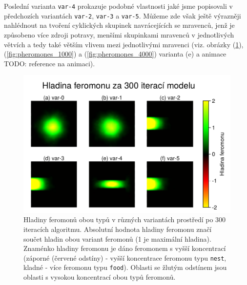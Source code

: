 \documentclass[10pt,a4paper,twocolumn]{article}
\begin{document}
Poslední varianta \texttt{var-4} prokazuje podobné vlastnosti 
jaké jsme popisovali v předchozích variantách 
\texttt{var-2}, \texttt{var-3} a \texttt{var-5}. Můžeme zde však ještě 
výrazněji nahlédnout na tvoření cyklických skupinek navrácejících
se mravenců, jenž je způsobeno více zdroji potravy, menšími skupinkami
mravenců v jednotlivých větvích a tedy také větším vlivem mezi 
jednotlivými mravenci (viz. obrázky (\ref{fig:pheromones_300}), 
(\ref{fig:pheromones_1000}) a (\ref{fig:pheromones_4000}) varianta (e)
a animace TODO: reference na animaci).


\begin{figure}[tb]
  \centering
  \includegraphics[width=0.98\linewidth]{images/pheromone_levels_300.pdf}
  \caption{Hladiny feromonů obou typů v různých variantách prostředí 
  po 300 iteracích algoritmu. 
  Absolutní hodnota hladiny feromonu značí součet hladin obou variant
  feromonů (1 je maximální hladina). Znaménko hladiny feromonu je dáno
  feromonem s vyšší koncentrací (záporné (červené odstíny) - vyšší 
  koncentrace feromonu typu \texttt{nest}, kladné - více feromonu typu
  \texttt{food}). Oblasti se žlutým odstínem jsou oblasti s vysokou 
  koncentrací obou typů feromonů.}
  \label{fig:pheromones_300}
\end{figure}
\end{document}

